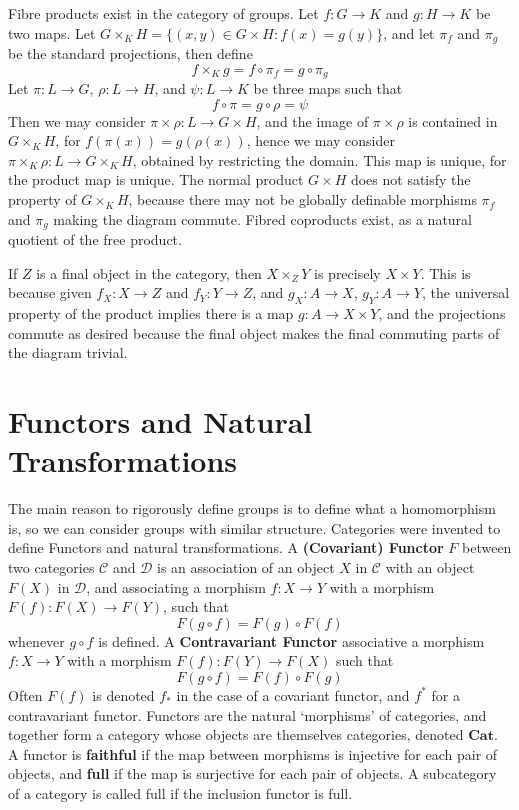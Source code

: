 \begin{example}
    Fibre products exist in the category of groups. Let $f: G \to K$ and $g: H \to K$ be two maps. Let $G \times_K H = \{ (x,y) \in G \times H : f(x) = g(y) \}$, and let $\pi_f$ and $\pi_g$ be the standard projections, then define
    \[ f \times_K g = f \circ \pi_f = g \circ \pi_g \]
    Let $\pi: L \to G$, $\rho: L \to H$, and $\psi: L \to K$ be three maps such that
    \[ f \circ \pi = g \circ \rho = \psi \]
    Then we may consider $\pi \times \rho: L \to G \times H$, and the image of $\pi \times \rho$ is contained in $G \times_K H$, for $f(\pi(x)) = g(\rho(x))$, hence we may consider $\pi \times_K \rho: L \to G \times_K H$, obtained by restricting the domain. This map is unique, for the product map is unique. The normal product $G \times H$ does not satisfy the property of $G \times_K H$, because there may not be globally definable morphisms $\pi_f$ and $\pi_g$ making the diagram commute. Fibred coproducts exist, as a natural quotient of the free product.
\end{example}

\begin{example}
    If $Z$ is a final object in the category, then $X \times_Z Y$ is precisely $X \times Y$. This is because given $f_X: X \to Z$ and $f_Y: Y \to Z$, and $g_X: A \to X$, $g_Y: A \to Y$, the universal property of the product implies there is a map $g: A \to X \times Y$, and the projections commute as desired because the final object makes the final commuting parts of the diagram trivial.
\end{example}

\section{Functors and Natural Transformations}

The main reason to rigorously define groups is to define what a homomorphism is, so we can consider groups with similar structure. Categories were invented to define Functors and natural transformations. A {\bf (Covariant) Functor} $F$ between two categories $\mathcal{C}$ and $\mathcal{D}$ is an association of an object $X$ in $\mathcal{C}$ with an object $F(X)$ in $\mathcal{D}$, and associating a morphism $f: X \to Y$ with a morphism $F(f): F(X) \to F(Y)$, such that
%
\[ F(g \circ f) = F(g) \circ F(f) \]
%
whenever $g \circ f$ is defined. A {\bf Contravariant Functor} associative a morphism $f: X \to Y$ with a morphism $F(f): F(Y) \to F(X)$ such that
%
\[ F(g \circ f) = F(f) \circ F(g) \]
%
Often $F(f)$ is denoted $f_*$ in the case of a covariant functor, and $f^*$ for a contravariant functor. Functors are the natural `morphisms' of categories, and together form a category whose objects are themselves categories, denoted $\mathbf{Cat}$. A functor is {\bf faithful} if the map between morphisms is injective for each pair of objects, and {\bf full} if the map is surjective for each pair of objects. A subcategory of a category is called full if the inclusion functor is full.

